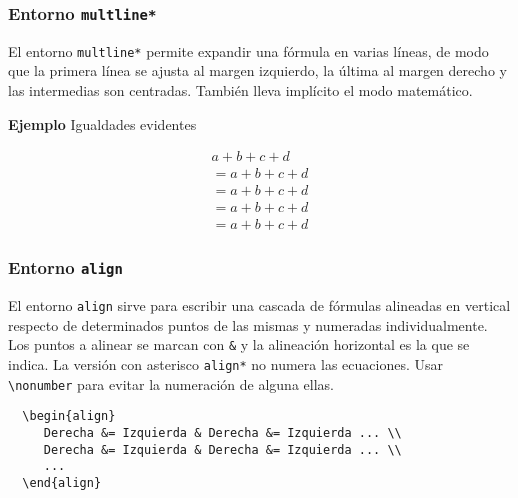 \documentclass[11pt,a4paper]{report}
\begin{document}
\subsubsection{Entorno \texttt{multline*}}





El entorno \texttt{multline*} permite expandir una fórmula en varias líneas, de modo que la primera línea se ajusta al margen izquierdo, la última al margen derecho y las intermedias son centradas. También lleva implícito el modo matemático.





\bigskip
\textbf{Ejemplo} Igualdades evidentes

\begin{multline*}
a+b+c+d\\
= a+b+c+d\\
= a+b+c+d\\
= a+b+c+d\\
= a+b+c+d
\end{multline*}

\bigskip





\subsubsection{Entorno \texttt{align}}





El entorno \texttt{align} sirve para escribir una cascada de fórmulas alineadas en vertical respecto de determinados puntos de las mismas y numeradas individualmente.
Los puntos a alinear se marcan con \texttt{\&} y la alineación horizontal es la que se indica. La versión con asterisco \texttt{align*} no numera las ecuaciones.
Usar \texttt{\textbackslash{}nonumber} para evitar la numeración de alguna ellas.
%
\begin{verbatim}
  \begin{align}
     Derecha &= Izquierda & Derecha &= Izquierda ... \\
     Derecha &= Izquierda & Derecha &= Izquierda ... \\
     ...
  \end{align}
\end{verbatim}
%
\end{document}
